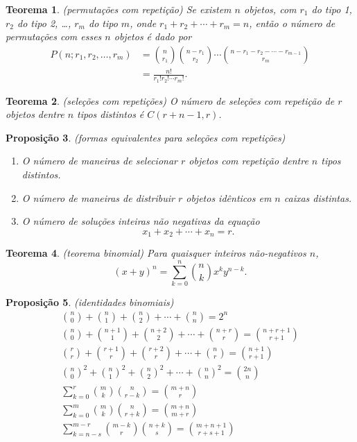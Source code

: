 \documentclass[12pt]{article}
\theoremstyle{plain}
\newtheorem{thm}{Teorema}[section]
\newtheorem{prop}[thm]{Proposição}
\theoremstyle{definition}
\theoremstyle{remark}
\begin{document}
\begin{thm} (permutações com repetição)
    Se existem \(n\) objetos, com \(r_1\) do tipo 1, \(r_2\) do tipo 2, \ldots, \(r_m\) do tipo \(m\), onde \(r_1 + r_2 + \cdots + r_m = n\), então o número de permutações com esses \(n\) objetos é dado por
    \begin{align}
        P(n;r_1,r_2,\ldots,r_m) &= \binom{n}{r_1}\binom{n-r_1}{r_2}\cdots\binom{n-r_1-r_2-\cdots-r_{m-1}}{r_m} \\
        &= \frac{n!}{r_1!r_2!\cdots r_m!}.
    \end{align}
\end{thm}

\begin{thm} (seleções com repetições)
    O número de seleções com repetição de \(r\) objetos dentre \(n\) tipos distintos é \(C(r+n-1,r)\).
\end{thm}

\begin{prop} (formas equivalentes para seleções com repetições)
    \begin{enumerate}
        \item O número de maneiras de selecionar \(r\) objetos com repetição dentre \(n\) tipos distintos.
        \item O número de maneiras de distribuir \(r\) objetos idênticos em \(n\) caixas distintas.
        \item O número de soluções inteiras não negativas da equação
        \begin{equation}
            x_1 + x_2 + \cdots + x_n = r.
        \end{equation}
    \end{enumerate}
\end{prop}

\begin{thm} (teorema binomial)
    Para quaisquer inteiros não-negativos \(n\),
    \begin{equation}
        (x+y)^n = \sum_{k=0}^{n} \binom{n}{k} x^k y^{n-k}.
    \end{equation}
\end{thm}

\begin{prop} (identidades binomiais)
    \begin{gather}
        \binom{n}{0}+\binom{n}{1}+\binom{n}{2}+\cdots+\binom{n}{n} = 2^n \\
        \binom{n}{0}+\binom{n+1}{1}+\binom{n+2}{2}+\cdots+\binom{n+r}{r} = \binom{n+r+1}{r+1} \\
        \binom{r}{r}+\binom{r+1}{r}+\binom{r+2}{r}+\cdots+\binom{n}{r} = \binom{n+1}{r+1} \\
        \binom{n}{0}^2 + \binom{n}{1}^2 + \binom{n}{2}^2 + \cdots + \binom{n}{n}^2 = \binom{2n}{n} \\
        \sum_{k=0}^{r} \binom{m}{k}\binom{n}{r-k} = \binom{m+n}{r} \\
        \sum_{k=0}^{m} \binom{m}{k}\binom{n}{r+k} = \binom{m+n}{m+r} \\
        \sum_{k=n-s}^{m-r} \binom{m-k}{r}\binom{n+k}{s} = \binom{m+n+1}{r+s+1} \\
    \end{gather}
\end{prop}
\end{document}
